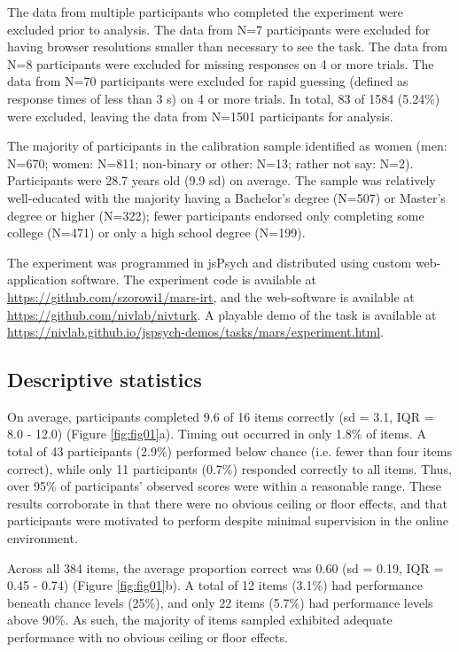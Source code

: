 \documentclass[a4paper,man,natbib]{apa6}
\begin{document}
The data from multiple participants who completed the experiment were excluded prior to analysis. The data from N=7 participants were excluded for having browser resolutions smaller than necessary to see the task. The data from N=8 participants were excluded for missing responses on 4 or more trials. The data from N=70 participants were excluded for rapid guessing (defined as response times of less than 3 s) on 4 or more trials. In total, 83 of 1584 (5.24\%) were excluded, leaving the data from N=1501 participants for analysis.

The majority of participants in the calibration sample identified as women (men: N=670; women: N=811; non-binary or other: N=13; rather not say: N=2). Participants were 28.7 years old (9.9 sd) on average. The sample was relatively well-educated with the majority having a Bachelor's degree (N=507) or Master's degree or higher (N=322); fewer participants endorsed only completing some college (N=471) or only a high school degree (N=199). 

The experiment was programmed in jsPsych \citep{de2015jspsych} and distributed using custom web-application software. The experiment code is available at \url{https://github.com/szorowi1/mars-irt}, and the web-software is available at \url{https://github.com/nivlab/nivturk}. A playable demo of the task is available at \url{https://nivlab.github.io/jspsych-demos/tasks/mars/experiment.html}.

\subsection{Descriptive statistics}

On average, participants completed 9.6 of 16 items correctly (sd = 3.1, IQR = 8.0 - 12.0) (Figure \ref{fig:fig01}a). Timing out occurred in only 1.8\% of items. A total of 43 participants (2.9\%) performed below chance (i.e. fewer than four items correct), while only 11 participants (0.7\%) responded correctly to all items. Thus, over 95\% of participants' observed scores were within a reasonable range. These results corroborate \cite{chierchia2019matrix} in that there were no obvious ceiling or floor effects, and that participants were motivated to perform despite minimal supervision in the online environment.

Across all 384 items, the average proportion correct was 0.60 (sd = 0.19, IQR = 0.45 - 0.74) (Figure \ref{fig:fig01}b). A total of 12 items (3.1\%) had performance beneath chance levels (25\%), and only 22 items (5.7\%) had performance levels above 90\%. As such, the majority of items sampled exhibited adequate performance with no obvious ceiling or floor effects. 
\end{document}
